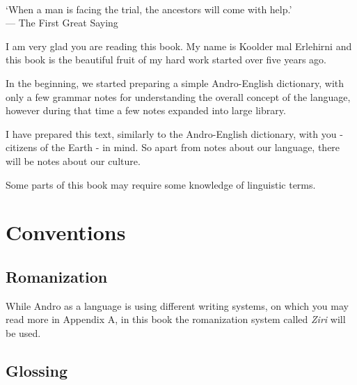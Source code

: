 \begin{center}\small
    \\
    `When a man is facing the trial, the ancestors will come with help.'\\
    --- The First Great Saying\footnotemark
\end{center}\bigskip


 I am very glad you are reading this book. My name is
Koolder mal Erlehirni and this book is the beautiful fruit of my hard work
started over five years ago.

In the beginning, we started preparing a simple Andro-English dictionary, with
only a few grammar notes for understanding the overall concept of the language,
however during that time a few notes expanded into large library.

I have prepared this text, similarly to the Andro-English dictionary, with you -
citizens of the Earth - in mind. So apart from notes about our language, there
will be notes about our culture.

Some parts of this book may require some knowledge of linguistic terms.

\bigskip


\section{Conventions}

\subsection{Romanization}

While Andro as a language is using different writing systems, on which you may
read more in Appendix A, in this book the romanization system called
\textit{Ziri} will be used.

\subsection{Glossing}


